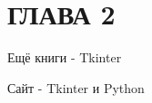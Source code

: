 \chapter{\label{ch:ch02}ГЛАВА 2}
Ещё книги - Tkinter ~\cite{book3, book4}

Сайт - Tkinter и Python ~\cite{site1}